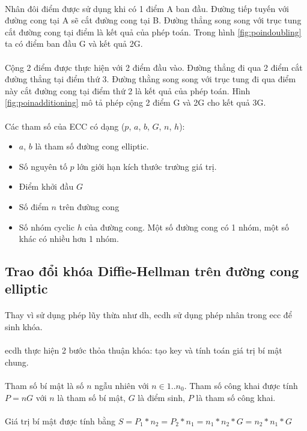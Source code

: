\paragraph{}
Nhân đôi điểm được sử dụng khi có 1 điểm A ban đầu. Đường tiếp tuyến với đường cong tại A sẽ cắt đường cong tại B. Đường thẳng song song với trục tung cắt đường cong tại điểm là kết quả của phép toán. Trong hình \ref{fig:poindoubling} ta có điểm ban đầu G và kết quả 2G.

\paragraph{}
Cộng 2 điểm được thực hiện với 2 điểm đầu vào. Đường thẳng đi qua 2 điểm cắt đường thẳng tại điểm thứ 3. Đường thằng song song với trục tung đi qua điểm này cắt đường cong tại điểm thứ 2 là kết quả của phép toán. Hình \ref{fig:poinadditioning} mô tả phép cộng 2 điểm G và 2G cho kết quả 3G.

\paragraph{}
Các tham số của ECC có dạng ($p$, $a$, $b$, $G$, $n$, $h$):
\begin{itemize}
	\item $a$, $b$ là tham số đường cong elliptic.
	\item Số nguyên tố $p$ lớn giới hạn kích thước trường giá trị.
	\item Điểm khởi đầu $G$
	\item Số điểm $n$ trên đường cong
	\item Số nhóm cyclic $h$ của đường cong. Một số đường cong có 1 nhóm, một số khác có nhiều hơn 1 nhóm.
\end{itemize}

\subsection{Trao đổi khóa Diffie-Hellman trên đường cong elliptic}

\paragraph{}
Thay vì sử dụng phép lũy thừa như \gls{dh}, \gls{ecdh} sử dụng phép nhân trong \gls{ecc} để sinh khóa.

\paragraph{}
\gls{ecdh} thực hiện 2 bước thỏa thuận khóa: tạo \gls{key} và tính toán giá trị bí mật chung. 

\paragraph{}
Tham số bí mật là số $n$ ngẫu nhiên với $n \in 1..n_0$. Tham số công khai được tính $P = nG$ với $n$ là tham số bí mật, $G$ là điểm sinh, $P$ là tham số công khai.

\paragraph{}
Giá trị bí mật được tính bằng $S = P_1* n_2 = P_2*n_1 = n_1 * n_2 * G = n_2 * n_1 * G$

